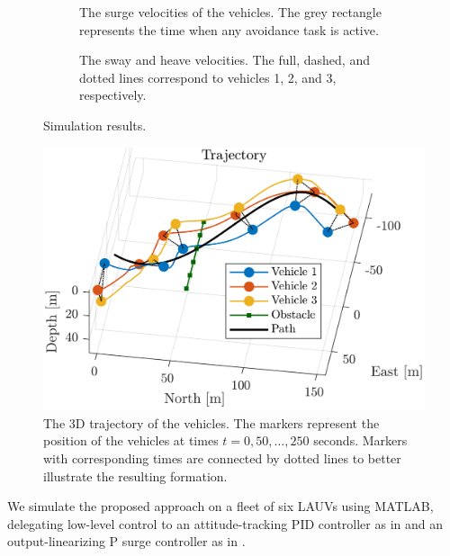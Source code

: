 \begin{figure}[ht]
\begin{subfigure}[t]{0.475\textwidth}
        \vspace{-8mm}
        \caption{The surge velocities of the vehicles. The grey rectangle represents the time when any avoidance task is active.}
        \label{fig:NSB_R_surge}
        \vspace{-2.5mm}
    \end{subfigure}
    \hspace{1em}
    \begin{subfigure}[t]{0.475\textwidth}
        \centering
        
        \vspace{-8mm}
        \caption{The sway and heave velocities. The full, dashed, and dotted lines correspond to vehicles 1, 2, and 3, respectively.}
        \label{fig:NSB_R_sway_heave}
        \vspace{-2.5mm}
    \end{subfigure}
    \caption{Simulation results.}
    \label{fig:NSB_R_results}
    
\end{figure}

\begin{figure}[b]
    \centering
    \includegraphics[width=.75\textwidth]{figures/nsb_R/trajectory.png}
    \vspace{-4mm}
    \caption{The 3D trajectory of the vehicles. The markers represent the position of the vehicles at times $t = 0, 50, \ldots, 250$ seconds. Markers with corresponding times are connected by dotted lines to better illustrate the resulting formation.}
    \label{fig:NSB_R_trajectory}
\end{figure}

We simulate the proposed approach on a fleet of six LAUVs \cite{sousa_LAUV_2012} using MATLAB, delegating low-level control to an attitude-tracking PID controller as in \cite{nakath_rigid_2017} and an output-linearizing P surge controller as in \cite{matouvs_formation_2022}.



